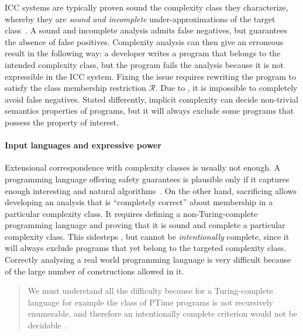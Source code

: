 ICC systems are typically proven sound \wrt the complexity class they
characterize, whereby they are \emph{sound and incomplete} under-approximations
of the target class~\cite[p. 125]{moyen2017}. A sound and incomplete analysis
admits false negatives, but guarantees the absence of false positives.
Complexity analysis can then give an erroneous result
in the following way: a developer writes a program that belongs to the intended
complexity class, but the program fails the analysis
because it is not expressible in the ICC system.
Fixing the issue requires rewriting the program to satisfy the class membership
restriction \(\mathcal{R}\). Due to , it
is impossible to completely avoid false negatives. Stated differently, implicit
complexity can decide non-trivial semantics properties of programs, but it will
always exclude some programs that possess the property of interest.

\paragraph*{Input languages and expressive power}
Extensional correspondence with complexity
classes is usually not enough. A programming language offering safety guarantees
is plausible only if it captures enough interesting and natural
algorithms~\cite{baillot2012}. On the other hand, sacrificing
 allows developing an analysis that is
\enquote{completely correct} about membership in a particular complexity
class. It requires defining a non-Turing-complete
programming language and proving that it is sound and
complete \wrt a particular complexity
class. This sidesteps , but cannot
be \emph{intentionally} complete, since it will always
exclude programs that yet belong to the targeted complexity
class. Correctly analysing a real world programming
language is very difficult because of the large number of constructions allowed
in it.

\begin{quotation}
\noindent We must understand all the diﬃculty because for a
Turing-complete language for example the class of
PTime programs is not recursively enumerable, and therefore an
intentionally complete criterion would not be decidable~\cite[Sect.
4.1]{mogbil2012}.
\end{quotation}

